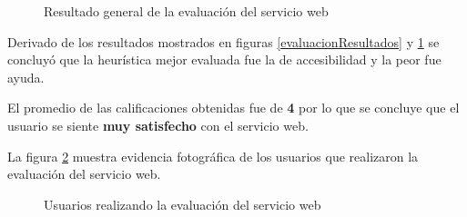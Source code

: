 \begin{figure}[!ht]
	\centering
    \caption{Resultado general de la evaluaci\'on del servicio web}
    \label{evaluacionResultadoGral}
\end{figure}

Derivado de los resultados mostrados en figuras \ref{evaluacionResultados} y \ref{evaluacionResultadoGral} se concluy\'o que la heur\'istica mejor evaluada fue la de accesibilidad y la peor fue ayuda.\newline

El promedio de las calificaciones obtenidas fue de \textbf{4} por lo que se concluye que el usuario se siente \textbf{muy satisfecho} con el servicio web.\newline

La figura \ref{evaluacionUsuarios} muestra evidencia fotogr\'afica de los usuarios que realizaron la evaluaci\'on del servicio web.\newline

\begin{figure}[!ht]
	\centering
    \caption{Usuarios realizando la evaluaci\'on del servicio web}
    \label{evaluacionUsuarios}
\end{figure}


